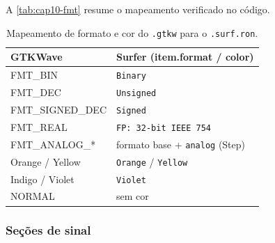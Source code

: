 A \autoref{tab:cap10-fmt} resume o mapeamento verificado no código.

\begin{table}[h]
\centering
\caption{Mapeamento de formato e cor do \texttt{.gtkw} para o \texttt{.surf.ron}.}
\label{tab:cap10-fmt}
\begin{tabularx}{\linewidth}{Y Y}
\toprule
\textbf{GTKWave} & \textbf{Surfer (item.format / color)} \\
\midrule
FMT\_BIN              & \lstinline|Binary| \\
FMT\_DEC             & \lstinline|Unsigned| \\
FMT\_SIGNED\_DEC      & \lstinline|Signed| \\
FMT\_REAL            & \lstinline|FP: 32-bit IEEE 754| \\
FMT\_ANALOG\_*        & formato base + \lstinline|analog| (Step) \\
Orange / Yellow      & \lstinline|Orange| / \lstinline|Yellow| \\
Indigo / Violet      & \lstinline|Violet| \\
NORMAL               & sem cor \\
\bottomrule
\end{tabularx}
\end{table}

\subsubsection{Seções de sinal}

